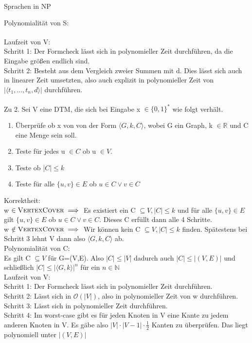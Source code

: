 \documentclass[answers]{submit}
\begin{document}
\begin{exercise}[6]{Sprachen in NP}
{  Polynomialität von S:\\



  \\
  Laufzeit von V:\\
  Schritt 1: Der Formcheck lässt sich in polynomieller Zeit durchführen, da die Eingabe größen endlich sind.\\
  Schritt 2: Besteht aus dem Vergleich zweier Summen mit d. Dies lässt sich auch in linearer Zeit umsetzten, also auch explizit in polynomieller Zeit von $\lvert  \langle t_{1},...,t_{n},d \rangle \rvert$ durchführen. \\
  \\
  Zu 2. Sei V eine DTM, die sich bei Eingabe x $\in \{ 0, 1 \}^{*}$ wie folgt verhält.\\
  \begin{enumerate}
    \item Überprüfe ob x von von der Form $\langle G, k, C \rangle$, wobei G ein Graph, k $\in \mathbb{R}$ und C eine Menge sein soll.
    \item Teste für jedes u $\in C$ ob u $\in V$.
    \item Teste ob $\lvert C \rvert \leq k$
    \item Teste für alle $\{ u,v \} \in E$ ob $u \in C \lor v \in C$
  \end{enumerate}
  Korrektheit:\\
  w $\in \textsc{VertexCover} \implies$ Es existiert ein C $\subseteq V, \lvert C \rvert \leq k$ und für alle $\{ u,v \} \in E$ gilt $\{ u,v \} \in E$ ob $u \in C \lor v \in C$. Dieses C erfüllt dann alle 4 Schritte.\\
  w $\notin \textsc{VertexCover} \implies$ Wir können kein C $\subseteq V, \lvert C \rvert \leq k$ finden. Spätestens bei Schritt 3 lehnt V dann also $\langle G, k, C \rangle$ ab. \\

  Polynomialität von C:\\
  Es gilt C $\subseteq V$ für G=(V,E). Also $\lvert C \rvert \leq \lvert V \rvert$ dadurch auch $\lvert C \rvert \leq \lvert (V,E) \rvert$ und schließlich $\lvert C \rvert \leq \lvert \langle G, k \rangle \rvert^{n}$ für ein $n \in \mathbb{N}$\\

  Laufzeit von V:\\
  Schritt 1: Der Formcheck lässt sich in polynomieller Zeit durchführen.\\
  Schritt 2: Lässt sich in $\mathcal{O}(|V|)$, also in polynomieller Zeit von w durchführen.\\
  Schritt 3: Lässt sich in polynomieller Zeit durchführen.\\
  Schritt 4: Im worst-case gibt es für jeden Knoten in V eine Kante zu jedem anderen Knoten in V. Es gäbe also $|V| \cdot |V-1| \cdot \frac{1}{2}$ Kanten zu überprüfen. Das liegt polynomiell unter $|(V,E)|$
  }
\end{exercise}
\end{document}
